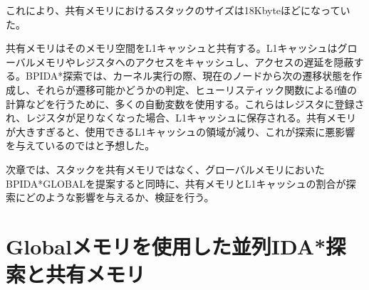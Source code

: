 \documentclass[a4paper,11pt,oneside,openany]{jsbook}
\begin{document}
これにより、共有メモリにおけるスタックのサイズは18Kbyteほどになっていた。

共有メモリはそのメモリ空間をL1キャッシュと共有する。L1キャッシュはグローバルメモリやレジスタへのアクセスをキャッシュし、アクセスの遅延を隠蔽する。BPIDA*探索では、カーネル実行の際、現在のノードから次の遷移状態を作成し、それらが遷移可能かどうかの判定、ヒューリスティック関数によるf値の計算などを行うために、多くの自動変数を使用する。これらはレジスタに登録され、レジスタが足りなくなった場合、L1キャッシュに保存される。共有メモリが大きすぎると、使用できるL1キャッシュの領域が減り、これが探索に悪影響を与えているのではと予想した。

次章では、スタックを共有メモリではなく、グローバルメモリにおいたBPIDA*GLOBALを提案すると同時に、共有メモリとL1キャッシュの割合が探索にどのような影響を与えるか、検証を行う。






\chapter{Globalメモリを使用した並列IDA*探索と共有メモリ}
\end{document}
